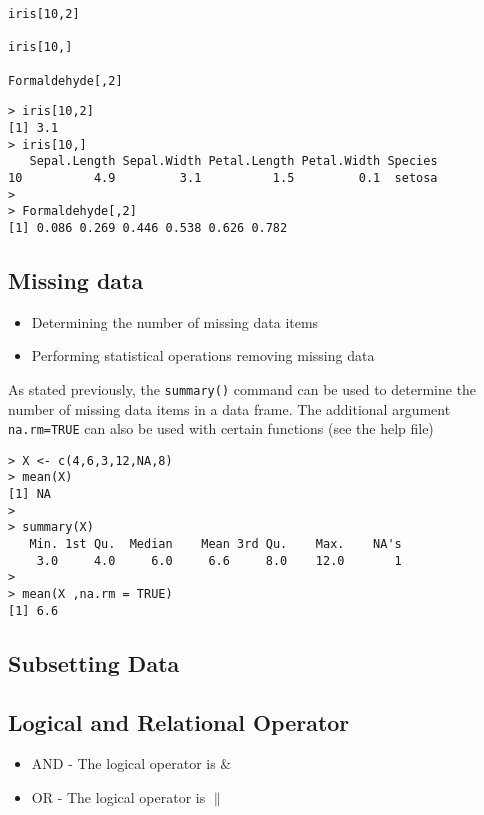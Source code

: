 \documentclass[12pt]{article}
\begin{document}
\begin{framed}
\begin{verbatim}
iris[10,2]

iris[10,] 

Formaldehyde[,2]  
\end{verbatim}
\end{framed}

\begin{verbatim}
> iris[10,2]
[1] 3.1
> iris[10,] 
   Sepal.Length Sepal.Width Petal.Length Petal.Width Species
10          4.9         3.1          1.5         0.1  setosa
> 
> Formaldehyde[,2]  
[1] 0.086 0.269 0.446 0.538 0.626 0.782
\end{verbatim}
\subsection*{Missing data}
\begin{itemize}
\item Determining the number of missing data items
\item Performing statistical operations removing missing data
\end{itemize}

As stated previously, the \texttt{summary()} command can be used to determine the number of missing data items in a data frame. The additional argument \texttt{na.rm=TRUE} can also be used with certain functions (see the help file)

\begin{verbatim}
> X <- c(4,6,3,12,NA,8)
> mean(X)
[1] NA
>
> summary(X)
   Min. 1st Qu.  Median    Mean 3rd Qu.    Max.    NA's 
    3.0     4.0     6.0     6.6     8.0    12.0       1
>
> mean(X ,na.rm = TRUE)
[1] 6.6
\end{verbatim}

\newpage
\subsection*{Subsetting Data}
\subsection*{Logical and Relational Operator}

\begin{itemize}
\item AND - The logical operator is $\&$
\item OR - The logical operator is $\|$
\end{itemize}
\end{document}
